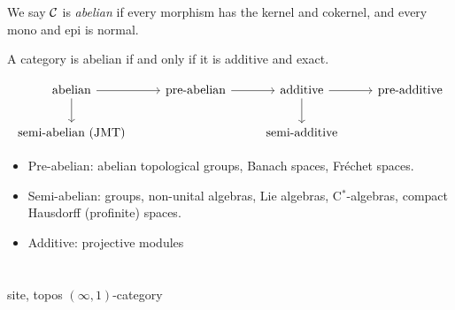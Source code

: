 \documentclass{../../large}
\begin{document}
\begin{prb}
We say $\mathcal{C}$ is \emph{abelian} if every morphism has the kernel and cokernel, and every mono and epi is normal.
\begin{parts}
\item A category is abelian if and only if it is additive and exact.
\end{parts}
\end{prb}


\begin{prb}
\end{prb}


\[\begin{tikzcd}[math mode=false]
abelian\ar{r}\ar{d} & pre-abelian \ar{r} & additive \ar{r}\ar{d} & pre-additive\\
semi-abelian (JMT) && semi-additive & \,
\end{tikzcd}\]
\begin{itemize}
\item Pre-abelian: abelian topological groups, Banach spaces, Fr\'echet spaces.
\item Semi-abelian: groups, non-unital algebras, Lie algebras, C$^*$-algebras, compact Hausdorff (profinite) spaces.
\item Additive: projective modules
\end{itemize}



\chapter{}
site, topos
$(\infty,1)$-category
\end{document}
